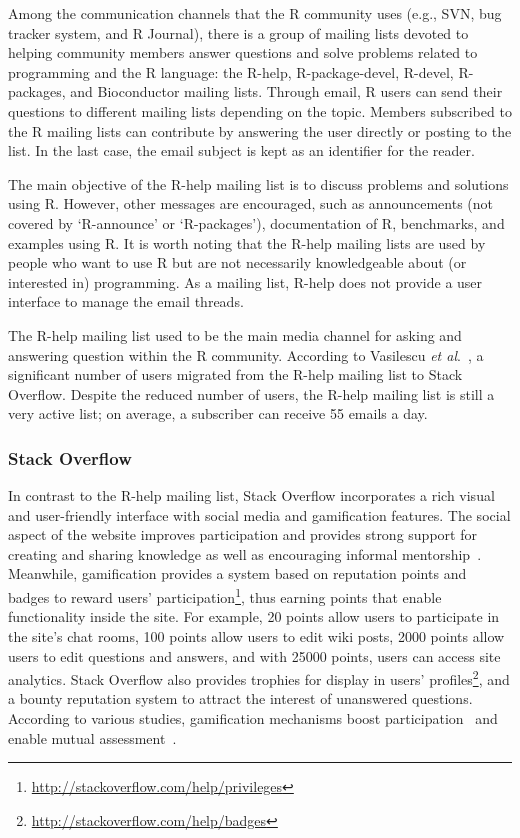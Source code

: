 \documentclass{sig-alternate-05-2015}
\begin{document}
	Among the communication channels that the R community uses (e.g., SVN, bug tracker system, and R Journal), there is a group of mailing lists devoted to helping community members answer questions and solve problems related to programming and the R language: the R-help, R-package-devel, R-devel, R-packages, and Bioconductor mailing lists.
	Through email, R users can send their questions to different mailing lists depending on the topic.
	Members subscribed to the R mailing lists can contribute by answering the user directly or posting to the list.
	In the last case, the email subject is kept as an identifier for the reader.

	The main objective of the R-help mailing list is to discuss problems and solutions using R. 
	However, other messages are encouraged, such as announcements (not covered by `R-announce' or `R-packages'), documentation of R, benchmarks, and examples using R. 
	It is worth noting that the R-help mailing lists are used by people who want to use R but are not necessarily knowledgeable about (or interested in) programming. 
	As a mailing list, R-help does not provide a user interface to manage the email threads.

	The R-help mailing list used to be the main media channel for asking and answering question within the R community.
	According to Vasilescu \textit{et al}.~\cite{Vasilescu2014c}, a significant number of users migrated from the R-help mailing list to Stack Overflow. 
	Despite the reduced number of users, the R-help mailing list is still a very active list; 
	on average, a subscriber can receive 55 emails a day.

\subsubsection{Stack Overflow}
\label{subsec:Rtag}

	In contrast to the R-help mailing list, Stack Overflow incorporates a rich visual and user-friendly interface with social media and gamification features.
	The social aspect of the website improves participation and provides strong support for creating and sharing knowledge as well as encouraging informal mentorship~\cite{Jenkins2009, Storey2014}.
	Meanwhile, gamification provides a system based on reputation points and badges to reward users' participation\footnote{\url{http://stackoverflow.com/help/privileges}}, thus earning points that enable functionality inside the site.
	For example, 20 points allow users to participate in the site's chat rooms, 100 points allow users to edit wiki posts, 2000 points allow users to edit questions and answers, and with 25000 points, users can access site analytics.
	Stack Overflow also provides trophies for display in users' profiles\footnote{\url{http://stackoverflow.com/help/badges}}, and a bounty reputation system to attract the interest of unanswered questions.
	According to various studies, gamification mechanisms boost participation~\cite{Vasilescu2014} and enable mutual assessment~\cite{Singer2013}.
\end{document}

